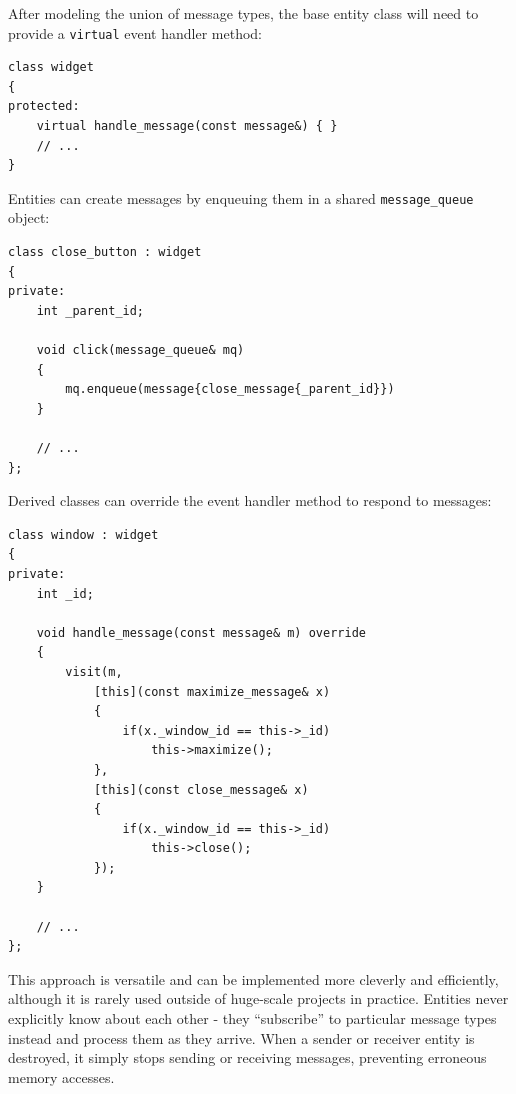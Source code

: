 \documentclass[twoside, 12pt, a4paper, openany]{book}
\begin{document}
After modeling the union of message types, the base entity class will
need to provide a
\texttt{virtual}
event handler method:

\begin{verbatim}
class widget
{
protected:
    virtual handle_message(const message&) { }
    // ...
}
\end{verbatim}

Entities can create messages by enqueuing them in a shared
\texttt{message_queue}
object:

\begin{verbatim}
class close_button : widget
{
private:
    int _parent_id;

    void click(message_queue& mq)
    {
        mq.enqueue(message{close_message{_parent_id}})
    }

    // ...
};
\end{verbatim}

Derived classes can override the event handler method to respond to
messages:

\begin{verbatim}
class window : widget
{
private:
    int _id;

    void handle_message(const message& m) override
    {
        visit(m,
            [this](const maximize_message& x)
            {
                if(x._window_id == this->_id)
                    this->maximize();
            },
            [this](const close_message& x)
            {
                if(x._window_id == this->_id)
                    this->close();
            });
    }

    // ...
};
\end{verbatim}

This approach is versatile and can be implemented more cleverly and
efficiently, although it is rarely used outside of huge-scale projects
in practice. Entities never explicitly know about each other - they
``subscribe'' to particular message types instead and process them as
they arrive. When a sender or receiver entity is destroyed, it simply
stops sending or receiving messages, preventing erroneous memory
accesses.
\end{document}
